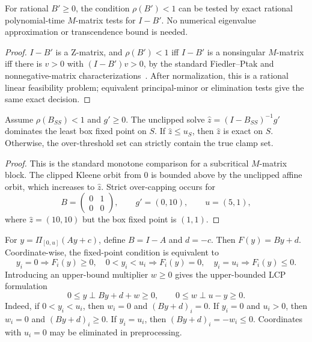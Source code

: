 \documentclass{llncs}
\newcommand{\clip}{\Pi}
\begin{document}
\begin{lemma}
\label{thm:mmatrix}
For rational \(B'\ge0\), the condition \(\rho(B')<1\) can be tested by exact rational polynomial-time \(M\)-matrix tests for \(I-B'\). No numerical eigenvalue approximation or transcendence bound is needed.
\end{lemma}
\begin{proof}
\(I-B'\) is a Z-matrix, and \(\rho(B')<1\) iff \(I-B'\) is a nonsingular \(M\)-matrix iff there is \(v>0\) with \((I-B')v>0\), by the standard Fiedler--Ptak and nonnegative-matrix characterizations~\cite{FiedlerPtak1962,BermanPlemmons1994}. After normalization, this is a rational linear feasibility problem; equivalent principal-minor or elimination tests give the same exact decision.
\end{proof}

\begin{lemma}
\label{lem:sub}
Assume \(\rho(B_{SS})<1\) and \(g'\ge0\). The unclipped solve \(\hat z=(I-B_{SS})^{-1}g'\) dominates the least box fixed point on \(S\). If \(\hat z\le u_S\), then \(\hat z\) is exact on \(S\). Otherwise, the over-threshold set can strictly contain the true clamp set.
\end{lemma}
\begin{proof}
This is the standard monotone comparison for a subcritical \(M\)-matrix block. The clipped Kleene orbit from \(0\) is bounded above by the unclipped affine orbit, which increases to \(\hat z\). Strict over-capping occurs for
\[
        B=\begin{pmatrix}0&1\\0&0\end{pmatrix},\qquad
        g'=(0,10),\qquad u=(5,1),
\]
where \(\hat z=(10,10)\) but the box fixed point is \((1,1)\).
\end{proof}

For \(y=\clip_{[0,u]}(Ay+c)\), define \(B=I-A\) and \(d=-c\). Then \(F(y)=By+d\). Coordinate-wise, the fixed-point condition is equivalent to
\[
 y_i=0\Rightarrow F_i(y)\ge0,
 \quad 0<y_i<u_i\Rightarrow F_i(y)=0,
 \quad y_i=u_i\Rightarrow F_i(y)\le0.
\]
Introducing an upper-bound multiplier \(w\ge0\) gives the upper-bounded LCP formulation
\[
  0\le y\perp By+d+w\ge0,
  \qquad
  0\le w\perp u-y\ge0.
\]
Indeed, if \(0<y_i<u_i\), then \(w_i=0\) and \((By+d)_i=0\). If \(y_i=0\) and \(u_i>0\), then \(w_i=0\) and \((By+d)_i\ge0\). If \(y_i=u_i\), then \((By+d)_i=-w_i\le0\). Coordinates with \(u_i=0\) may be eliminated in preprocessing.
\end{document}
